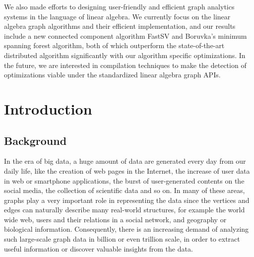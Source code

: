 \documentclass{sokendai_thesis} %
\begin{document}
We also made efforts to designing user-friendly and efficient graph analytics systems in the language of linear algebra. We currently focus on the linear algebra graph algorithms and their efficient implementation, and our results include a new connected component algorithm FastSV and Boruvka's minimum spanning forest algorithm, both of which outperform the state-of-the-art distributed algorithm significantly with our algorithm specific optimizations. In the future, we are interested in compilation techniques to make the detection of optimizations viable under the standardized linear algebra graph APIs.

\tableofcontents
\listoffigures
\listoftables
\listofalgorithms {}


\mainmatter

\chapter{Introduction}
\label{chap:introduction}


\section{Background}

In the era of big data, a huge amount of data are generated every day from our daily life, like the creation of web pages in the Internet, the increase of user data in web or smartphone applications, the burst of user-generated contents on the social media, the collection of scientific data and so on.
In many of these areas, graphs play a very important role in representing the data since the vertices and edges can naturally describe many real-world structures, for example the world wide web, users and their relations in a social network, and geography or biological information.
Consequently, there is an increasing demand of analyzing such large-scale graph data in billion or even trillion scale, in order to extract useful information or discover valuable insights from the data.
\end{document}
